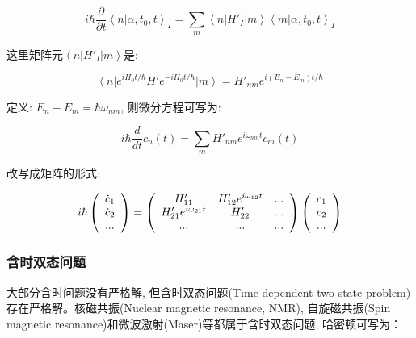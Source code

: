 \begin{equation*}
i \hbar \frac{\partial}{\partial t} \left\langle n | \alpha,
t_0,t\right\rangle_I = \sum\limits_m \left\langle n \right| H'_I
\left|m \right\rangle \left\langle m | \alpha, t_0,t \right\rangle_I
\end{equation*}

这里矩阵元$\left\langle n \right| H'_I \left|m \right\rangle$是:

\begin{equation*}
\left\langle n \right| e^{iH_0t/\hbar}H'e^{-iH_0t/\hbar}\left|m
\right\rangle = H'_{nm} e^{i (E_n -E_m)t/\hbar}
\end{equation*}

定义: $E_n - E_m = \hbar \omega_{nm}$, 则微分方程可写为:

\begin{equation*}
i\hbar \frac{d}{dt} c_n(t) = \sum\limits_{m}
H'_{nm}e^{i\omega_{nm}t}c_m(t)
\end{equation*}

改写成矩阵的形式:


\begin{equation}\label{time dependent sch eq matrix}
i\hbar \left( \begin{array}{l}
 \dot c_1  \\
 \dot c_2  \\
 ... \\
 \end{array} \right) = \left( {\begin{array}{*{20}c}
   {H'_{11} } & {H'_{12} e^{i\omega _{12} t} } & {...}  \\
   {H'_{21} e^{i\omega _{21} t} } & {H'_{22} } & {...}  \\
   {...} & {...} & {...}  \\
\end{array}} \right)\left( \begin{array}{l}
 c_1  \\
 c_2  \\
 ... \\
 \end{array} \right)
\end{equation}

\subsubsection*{含时双态问题}


大部分含时问题没有严格解, 但含时双态问题(Time-dependent two-state
problem)存在严格解。核磁共振(Nuclear magnetic resonance, NMR),
自旋磁共振(Spin magnetic resonance)和微波激射(Maser)等都属于含时双态问题, 哈密顿可写为：

